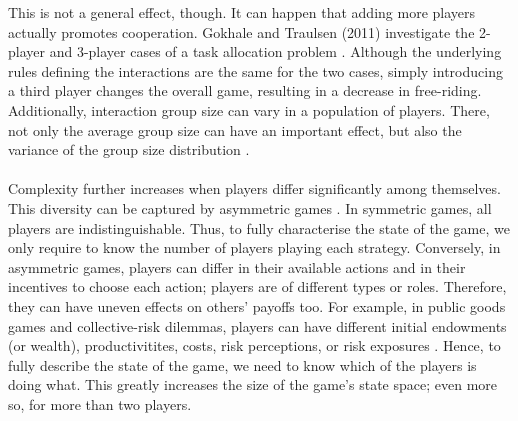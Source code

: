 \documentclass[11pt]{article}
\theoremstyle{plainCl1}
\theoremstyle{plainCl2}
\begin{document}
This is not a general effect, though. It can happen that adding more players actually promotes cooperation. Gokhale and Traulsen (2011) investigate the 2-player and 3-player cases of a task allocation problem \cite{gokhale:JTB:2011}. Although the underlying rules defining the interactions are the same for the two cases, simply introducing a third player changes the overall game, resulting in a decrease in free-riding.
Additionally, interaction group size can vary in a population of players. There, not only the average group size can have an important effect, but also the variance of the group size distribution \cite{Pena:Evolution:2011, Broom:BMB:2019}.
\\ \\ 
\noindent Complexity further increases when players differ significantly among themselves. This diversity can be captured by asymmetric games \cite{Taylor:JAP:1979, Schuster:AB:1981, Gaunersdorfer:TPB:1991, Hofbauer:JMB:1996, Hofbauer:GEB:2005, Ohtsuki:JTB:2010, McAvoy:PlosCB:2015, Veller:JET:2016, Hauser:Nature:2019}. In symmetric games, all players are indistinguishable. Thus, to fully characterise the state of the game, we only require to know the number of players playing each strategy. Conversely, in asymmetric games, players can differ in their available actions and in their incentives to choose each action; players are of different types or roles. Therefore, they can have uneven effects on others' payoffs too. For example, in public goods games and collective-risk dilemmas, players can have different initial endowments (or wealth), productivitites, costs, risk perceptions, or risk exposures \cite{Milinski:CC:2011, Vasconcelos:PNAS:2014, Abouchakra:JTB:2014, Hauser:Nature:2019, Merhej:JAIR:2022, Wang:PTRSB:2023}. Hence, to fully describe the state of the game, we need to know which of the players is doing what. This greatly increases the size of the game's state space; even more so, for more than two players.  \\ \\ 
\end{document}
